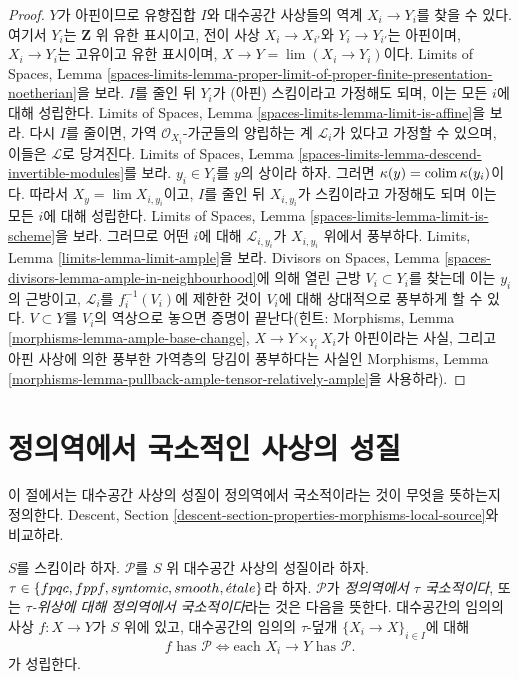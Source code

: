 \begin{proof}
\medskip\noindent
$Y$가 아핀이므로 유향집합 $I$와 대수공간 사상들의 역계
$X_i\to Y_i$를 찾을 수 있다. 여기서 $Y_i$는 $\mathbf{Z}$ 위 유한
표시이고, 전이 사상 $X_i\to X_{i'}$와 $Y_i\to Y_{i'}$는 아핀이며,
$X_i\to Y_i$는 고유이고 유한 표시이며,
$X\to Y=\lim(X_i\to Y_i)$이다. Limits of Spaces, Lemma
\ref{spaces-limits-lemma-proper-limit-of-proper-finite-presentation-noetherian}을
보라. $I$를 줄인 뒤 $Y_i$가 (아핀) 스킴이라고 가정해도 되며, 이는 모든
$i$에 대해 성립한다. Limits of Spaces, Lemma
\ref{spaces-limits-lemma-limit-is-affine}을 보라. 다시 $I$를 줄이면, 가역
$\mathcal{O}_{X_i}$-가군들의 양립하는 계 $\mathcal{L}_i$가 있다고
가정할 수 있으며, 이들은 $\mathcal{L}$로 당겨진다. Limits of Spaces, Lemma
\ref{spaces-limits-lemma-descend-invertible-modules}를 보라. $y_i\in Y_i$를
$y$의 상이라 하자. 그러면 $\kappa(y)=\mathop{\mathrm{colim}}\nolimits\kappa(y_i)$이다. 따라서
$X_y=\lim X_{i,y_i}$이고, $I$를 줄인 뒤 $X_{i,y_i}$가 스킴이라고
가정해도 되며 이는 모든 $i$에 대해 성립한다. Limits of Spaces, Lemma
\ref{spaces-limits-lemma-limit-is-scheme}을 보라. 그러므로 어떤 $i$에 대해
$\mathcal{L}_{i,y_i}$가 $X_{i,y_i}$ 위에서 풍부하다. Limits, Lemma
\ref{limits-lemma-limit-ample}을 보라. Divisors on Spaces, Lemma
\ref{spaces-divisors-lemma-ample-in-neighbourhood}에 의해 열린 근방
$V_i\subset Y_i$를 찾는데 이는 $y_i$의 근방이고, $\mathcal{L}_i$를 $f_i^{-1}(V_i)$에 제한한 것이
$V_i$에 대해 상대적으로 풍부하게 할 수 있다. $V\subset Y$를 $V_i$의
역상으로 놓으면 증명이 끝난다(힌트: Morphisms, Lemma
\ref{morphisms-lemma-ample-base-change}, $X\to Y\times_{Y_i}X_i$가 아핀이라는
사실, 그리고 아핀 사상에 의한 풍부한 가역층의 당김이 풍부하다는 사실인
Morphisms, Lemma
\ref{morphisms-lemma-pullback-ample-tensor-relatively-ample}을 사용하라).
\end{proof}

\section{정의역에서 국소적인 사상의 성질}
\label{section-properties-morphisms-local-source}

\noindent
이 절에서는 대수공간 사상의 성질이 정의역에서 국소적이라는 것이 무엇을
뜻하는지 정의한다. Descent, Section
\ref{descent-section-properties-morphisms-local-source}와 비교하라.

\begin{definition}
\label{definition-property-morphisms-local-source}
$S$를 스킴이라 하자. $\mathcal{P}$를 $S$ 위 대수공간 사상의 성질이라
하자. $\tau\in\{fpqc,\linebreak[0] fppf,\linebreak[0] syntomic,\linebreak[0]
smooth,\linebreak[0]\etale\}$라 하자. $\mathcal{P}$가
{\it 정의역에서 $\tau$ 국소적이다}, 또는
{\it $\tau$-위상에 대해 정의역에서 국소적이다}라는 것은 다음을
뜻한다. 대수공간의 임의의 사상 $f:X\to Y$가 $S$ 위에 있고, 대수공간의 임의의
$\tau$-덮개 $\{X_i\to X\}_{i\in I}$에 대해
$$
f \text{ has }\mathcal{P}
\Leftrightarrow
\text{each }X_i \to Y\text{ has }\mathcal{P}.
$$
가 성립한다.
\end{definition}

